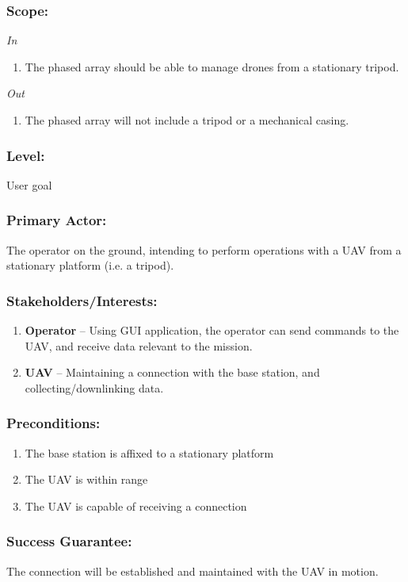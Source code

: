 \documentclass[ProductRequirements.tex]{subfiles}
\begin{document}
	\subsubsection*{Scope:}
	\textit{In}
	\begin{enumerate}
		\item The phased array should be able to manage drones from a stationary tripod.
	\end{enumerate}
	\textit{Out}
	\begin{enumerate}
		\item The phased array will not include a tripod or a mechanical casing.
	\end{enumerate}
	\subsubsection*{Level:}
	User goal
	\subsubsection*{Primary Actor:}
	The operator on the ground, intending to perform operations with a UAV from a stationary platform (i.e. a tripod).
	\subsubsection*{Stakeholders/Interests:}
	\begin{enumerate}\itemsep1pt
		\item \textbf{Operator} -- Using GUI application, the operator can send commands to the UAV, and receive data relevant to the mission. 
		\item \textbf{UAV} -- Maintaining a connection with the base station, and collecting/downlinking data. 
	\end{enumerate}
	\subsubsection*{Preconditions:}
	\begin{enumerate}\itemsep1pt
		\item The base station is affixed to a stationary platform
		\item The UAV is within range
		\item The UAV is capable of receiving a connection
	\end{enumerate}
	\subsubsection*{Success Guarantee:}
	The connection will be established and maintained with the UAV in motion.
\end{document}
